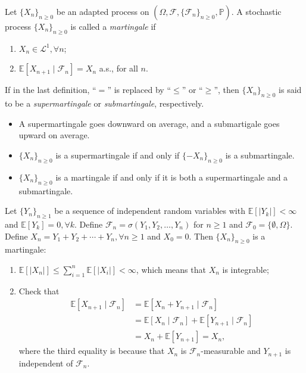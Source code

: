 \begin{definition}[Martingale]
Let $\{X_n\}_{n\ge0}$ be an adapted process on $(\Omega, \mathcal{F},\{\mathcal{F}_n\}_{n\ge0},\mathbb{P})$.
A stochastic process $\{X_n\}_{n\ge0}$ is called a \emph{martingale} if
\begin{enumerate}
\item
$X_n\in\mathcal{L}^1,\forall n$;
\item
$\mathbb{E}[X_{n+1}\mid\mathcal{F}_n] = X_n$ a.s., for all $n$.
\end{enumerate}
If in the last definition, ``$=$'' is replaced by ``$\le$'' or ``$\ge$'', then $\{X_n\}_{n\ge0}$
is said to be a \emph{supermartingale} or \emph{submartingale}, respectively.
\end{definition}

\begin{remark}
\begin{itemize}
\item
A supermartingale goes downward on average, and a submartigale goes upward on average.
\item
$\{X_n\}_{n\ge0}$ is a supermartingale if and only if $\{-X_n\}_{n\ge0}$ is a submartingale.
\item
$\{X_n\}_{n\ge0}$ is a martingale if and only if it is both a supermartingale and a submartingale.
\end{itemize}
\end{remark}


\begin{example}
Let $\{Y_n\}_{n\ge1}$ be a sequence of independent random variables with 
$\mathbb{E}[|Y_k|]<\infty$ and $\mathbb{E}[Y_k]=0, \forall k$.
Define $\mathcal{F}_n = \sigma(Y_1,Y_2,\ldots,Y_n)$ for $n\ge1$ and $\mathcal{F}_0=\{\emptyset,\Omega\}$.
Define $X_n = Y_1+Y_2+\cdots+Y_n,\forall n\ge1$ and $X_0=0$.
Then $\{X_n\}_{n\ge0}$ is a martingale:
\begin{enumerate}
\item
$\mathbb{E}[|X_n|]\le\sum_{i=1}^n\mathbb{E}[|X_i|]<\infty$, which means that $X_n$ is integrable;
\item
Check that
\begin{align*}
\mathbb{E}[X_{n+1}\mid\mathcal{F}_n]&=\mathbb{E}[X_n + Y_{n+1}\mid\mathcal{F}_n]\\
&=\mathbb{E}[X_n\mid\mathcal{F}_n] + \mathbb{E}[Y_{n+1}\mid\mathcal{F}_n]\\
&=X_n + \mathbb{E}[Y_{n+1}]=X_n,
\end{align*}
where the third equality is because that $X_n$ is $\mathcal{F}_n$-measurable
and $Y_{n+1}$ is independent of $\mathcal{F}_n$.
\end{enumerate}
\end{example}

